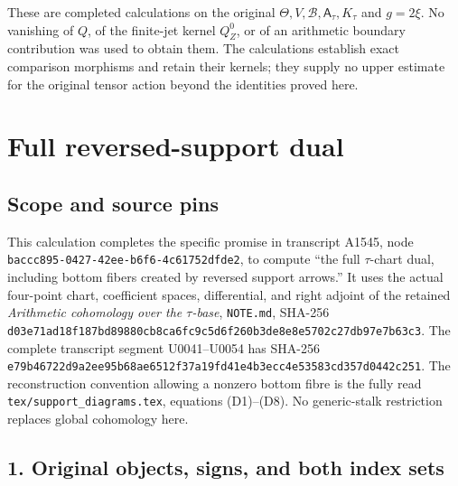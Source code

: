 \documentclass[10pt,a4paper,oneside]{report}
\begin{document}
These are completed calculations on the original
\(\Theta,V,\mathscr B,\mathsf A_\tau,K_\tau\) and \(g=2\xi\). No
vanishing of \(Q\), of the finite-jet kernel \(Q_Z^0\), or of an
arithmetic boundary contribution was used to obtain them. The
calculations establish exact comparison morphisms and retain their
kernels; they supply no upper estimate for the original tensor action
beyond the identities proved here.


\endgroup
\clearpage
\chapter{Full reversed-support dual}
\begingroup



\section{Scope and source pins}\label{proof03:scope-and-source-pins}

This calculation completes the specific promise in transcript A1545,
node \texttt{baccc895-\allowbreak{}0427-\allowbreak{}42ee-\allowbreak{}b6f6-\allowbreak{}4c61752dfde2}, to compute ``the
full \ensuremath{\tau}-chart dual, including bottom fibers created by reversed support
arrows.'' It uses the actual four-point chart, coefficient spaces,
differential, and right adjoint of the retained \emph{Arithmetic
cohomology over the \ensuremath{\tau}-base}, \texttt{NOTE.md}, SHA-256
\texttt{d03e71ad\allowbreak{}18f187bd\allowbreak{}89880cb8\allowbreak{}ca6fc9c5\allowbreak{}d6f260b3\allowbreak{}de8e8e57\allowbreak{}02c27db9\allowbreak{}7e7b63c3}.
The complete transcript segment U0041--U0054 has SHA-256
\texttt{e79b4672\allowbreak{}2d9a2ee9\allowbreak{}5b68ae65\allowbreak{}12f37a19\allowbreak{}fd41e4b3\allowbreak{}ecc4e535\allowbreak{}83cd357d\allowbreak{}0442c251}.
The reconstruction convention allowing a nonzero bottom fibre is the
fully read \texttt{tex/\allowbreak{}support\_\allowbreak{}diagrams.tex}, equations (D1)--(D8). No
generic-stalk restriction replaces global cohomology here.

\section{1. Original objects, signs, and both index
sets}\label{proof03:original-objects-signs-and-both-index-sets}
\end{document}
